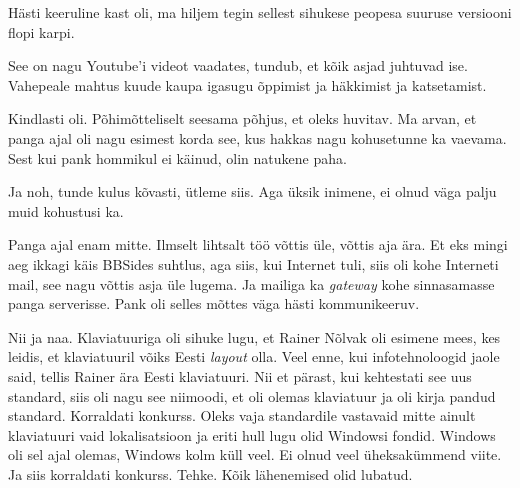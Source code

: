 Hästi keeruline kast oli, ma hiljem tegin  sellest sihukese peopesa suuruse versiooni flopi karpi.


See on nagu Youtube'i videot vaadates, tundub, et  kõik asjad juhtuvad ise. Vahepeale mahtus kuude kaupa igasugu õppimist ja häkkimist ja katsetamist.


Kindlasti oli. Põhimõtteliselt seesama põhjus, et oleks huvitav. Ma arvan, et panga ajal oli nagu esimest korda  see, kus hakkas nagu kohusetunne ka vaevama. Sest kui pank  hommikul ei käinud, olin natukene paha.

Ja noh, tunde kulus kõvasti, ütleme siis. Aga üksik inimene,  ei olnud  väga palju muid kohustusi ka.


Panga ajal enam mitte. Ilmselt lihtsalt töö võttis üle,  võttis aja ära. Et eks mingi aeg ikkagi käis BBSides suhtlus, aga siis, kui Internet tuli, siis oli kohe Interneti mail, see nagu võttis asja üle lugema. Ja mailiga ka \emph{gateway} kohe sinnasamasse panga serverisse. Pank oli selles mõttes väga hästi kommunikeeruv.


Nii ja naa. Klaviatuuriga oli sihuke lugu, et Rainer Nõlvak oli esimene mees, kes leidis, et klaviatuuril võiks Eesti \emph{layout} olla. Veel enne, kui infotehnoloogid jaole said, tellis Rainer ära Eesti klaviatuuri. Nii et pärast, kui kehtestati see uus standard, siis oli nagu see niimoodi, et oli olemas klaviatuur ja oli kirja pandud standard. Korraldati konkurss. Oleks vaja standardile vastavaid mitte ainult klaviatuuri vaid lokalisatsioon ja eriti hull lugu olid Windowsi fondid. Windows oli sel ajal olemas, Windows kolm küll veel. Ei olnud veel üheksakümmend viite. Ja siis korraldati konkurss. Tehke. Kõik lähenemised olid lubatud.



